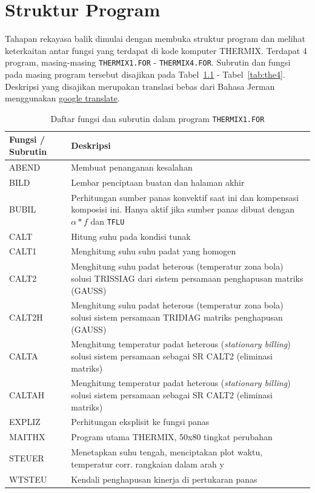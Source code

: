 \documentclass[a4paper,11pt]{report}
\renewcommand{\tablename}{Tabel}
\begin{document}
\chapter{Struktur Program}
Tahapan rekayasa balik dimulai dengan membuka struktur program dan melihat keterkaitan antar fungsi yang terdapat di kode komputer THERMIX. Terdapat 4 program, masing-masing \texttt{THERMIX1.FOR} - \texttt{THERMIX4.FOR}. Subrutin dan fungsi pada masing program tersebut disajikan pada \tablename~\ref{tab:the1} - \tablename~\ref{tab:the4}. Deskripsi yang disajikan merupakan translasi bebas dari Bahasa Jerman menggunakan \href{https://translate.google.com/}{google translate}.

\begin{table}[h!]
  \caption{Daftar fungsi dan subrutin dalam program \texttt{THERMIX1.FOR}}
  \label{tab:the1}

  \begin{center}
    \begin{tabular}{p{3cm}|p{10cm}}
    \toprule
       Fungsi / Subrutin & Deskripsi\\ \midrule
       ABEND & Membuat penanganan kesalahan \\
       BILD & Lembar penciptaan buatan dan halaman akhir \\
       BUBIL & Perhitungan sumber panas konvektif saat ini dan kompensasi komposisi ini. Hanya aktif jika sumber panas dibuat dengan $\alpha * f$ dan \texttt{TFLU} \\
       CALT & Hitung suhu pada kondisi tunak \\
       CALT1 & Menghitung suhu suhu padat yang homogen \\
       CALT2 & Menghitung suhu padat heterous (temperatur zona bola) solusi TRISSIAG dari sistem persamaan penghapusan matriks (GAUSS) \\
       CALT2H & Menghitung suhu padat heterous (temperatur zona bola) solusi sistem persamaan TRIDIAG matriks penghapusan (GAUSS) \\
       CALTA & Menghitung temperatur padat heterous (\textit{stationary billing}) solusi sistem persamaan sebagai SR CALT2 (eliminasi matriks) \\
       CALTAH & Menghitung temperatur padat heterous (\textit{stationary billing}) solusi sistem persamaan sebagai SR CALT2 (eliminasi matriks) \\
       EXPLIZ & Perhitungan eksplisit ke fungsi panas \\
       MAITHX & Program utama THERMIX, 50x80 tingkat perubahan \\
       STEUER & Menetapkan suhu tengah, menciptakan plot waktu, temperatur corr. rangkaian dalam arah y \\ 
       WTSTEU & Kendali penghapusan kinerja di pertukaran panas \\
       \bottomrule
    \end{tabular}
  \end{center}
\end{table}
\end{document}
